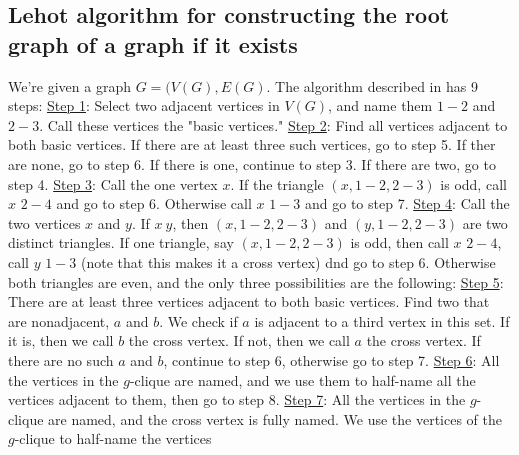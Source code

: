 \documentclass[11pt]{article}
\begin{document}
\subsection{Lehot algorithm for constructing the root graph of a graph if it exists}
We're given a graph $G=(V(G),E(G)$. The algorithm described in \cite{Lehot} has 9 steps:
\newline
\newline
\noindent
\underline{Step 1}:
Select two adjacent vertices in $V(G)$, and name them $1-2$ and $2-3$. Call
these vertices the "basic vertices."
\newline
\newline
\noindent
\underline{Step 2}:
Find all vertices adjacent to both basic vertices. If there are at least three
such vertices, go to step 5. If ther are none, go to step 6. If there is one,
continue to step 3. If there are two, go to step 4.
\newline
\newline
\noindent
\underline{Step 3}:
Call the one vertex $x$. If the triangle $(x,1-2,2-3)$ is odd, call $x$ $2-4$
and go to step 6. Otherwise call $x$ $1-3$ and go to step 7.
\newline
\newline
\noindent
\underline{Step 4}:
Call the two vertices $x$ and $y$. If $x~y$, then $(x,1-2,2-3)$ and
$(y,1-2,2-3)$ are two distinct triangles. If one triangle, say $(x,1-2,2-3)$
is odd, then call $x$ $2-4$, call $y$ $1-3$ (note that this makes it a cross
vertex) dnd go to step 6. Otherwise both triangles are even, and the only
three possibilities are the following:
\newline
\newline
\noindent
\underline{Step 5}:
There are at least three vertices adjacent to both basic vertices. Find two
that are nonadjacent, $a$ and $b$. We check if $a$ is adjacent to a third
vertex in this set. If it is, then we call $b$ the cross vertex. If not, then
we call $a$ the cross vertex. If there are no such $a$ and $b$, continue to
step 6, otherwise go to step 7.
\newline
\newline
\noindent
\underline{Step 6}:
All the vertices in the $g$-clique are named, and we use them to half-name all
the vertices adjacent to them, then go to step 8.
\newline
\newline
\noindent
\underline{Step 7}:
All the vertices in the $g$-clique are named, and the cross vertex is fully
named.  We use the vertices of the $g$-clique to half-name the vertices
\end{document}
